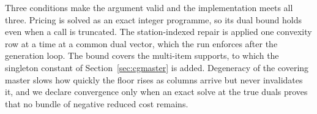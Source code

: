 \documentclass[]{interact}
\begin{document}
Three conditions make the argument valid and the implementation meets all three. Pricing is solved as an exact integer programme, so its dual bound holds even when a call is truncated. The station-indexed repair is applied one convexity row at a time at a common dual vector, which the run enforces after the generation loop. The bound covers the multi-item supports, to which the singleton constant of Section~\ref{sec:cgmaster} is added. Degeneracy of the covering master slows how quickly the floor rises as columns arrive but never invalidates it, and we declare convergence only when an exact solve at the true duals proves that no bundle of negative reduced cost remains.
\end{document}

